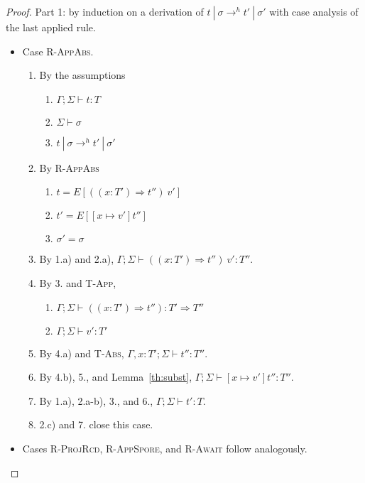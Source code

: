 \documentclass{article}
\theoremstyle{definition}
\begin{document}
\begin{proof}

Part 1: by induction on a derivation of $t~|~\sigma \rightarrow^h t'~|~\sigma'$ with case analysis of the last applied rule.

\begin{itemize}
\item Case \textsc{R-AppAbs}.
\begin{enumerate}
\item By the assumptions
  \begin{enumerate}[label=(\alph*)]
  \item $\Gamma ; \Sigma \vdash t : T$
  \item $\Sigma \vdash \sigma$
  \item $t~|~\sigma \rightarrow^h t'~|~\sigma'$
  \end{enumerate}
\item By \textsc{R-AppAbs}
  \begin{enumerate}[label=(\alph*)]
  \item $t = E[((x : T') \Rightarrow t'')~v']$
  \item $t' = E[[x \mapsto v']t'']$
  \item $\sigma' = \sigma$
  \end{enumerate}
\item By 1.a) and 2.a), $\Gamma ; \Sigma \vdash ((x : T') \Rightarrow t'')~v' : T''$.
\item By 3. and \textsc{T-App},
  \begin{enumerate}[label=(\alph*)]
  \item $\Gamma ; \Sigma \vdash ((x : T') \Rightarrow t'') : T' \Rightarrow T''$
  \item $\Gamma ; \Sigma \vdash v' : T'$
  \end{enumerate}
\item By 4.a) and \textsc{T-Abs}, $\Gamma , x : T' ; \Sigma \vdash t'' : T''$.
\item By 4.b), 5., and Lemma~\ref{th:subst}, $\Gamma ; \Sigma \vdash [x \mapsto v']t'' : T''$.
\item By 1.a), 2.a-b), 3., and 6., $\Gamma ; \Sigma \vdash t' : T$.
\item 2.c) and 7. close this case.
\end{enumerate}

\item Cases \textsc{R-ProjRcd}, \textsc{R-AppSpore}, and \textsc{R-Await} follow analogously.


\end{itemize}
\end{proof}
\end{document}
